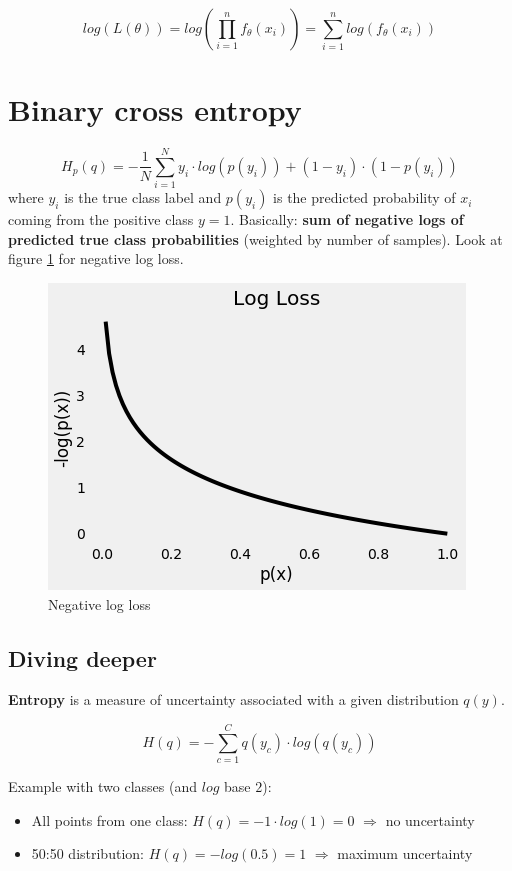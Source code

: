 \documentclass{scrartcl}
\begin{document}
$$log(L(\theta)) = log(\prod_{i=1}^n f_{\theta}(x_i)) = \sum_{i=1}^n log(f_{\theta}(x_i))$$

\section[Binary cross entropy]{Binary cross entropy \cite{bce-tds}}
$$H_p(q) = -\frac{1}{N} \sum_{i=1}^N y_i \cdot log(p(y_i)) + (1-y_i) \cdot (1-p(y_i))$$
where $y_i$ is the true class label and $p(y_i)$ is the predicted probability of $x_i$ coming from the positive class $y=1$. Basically: \textbf{sum of negative logs of predicted true class probabilities} (weighted by number of samples). Look at figure \ref{fig:binary_cross_neg_log} for negative log loss.

\begin{figure}
	\centering
		\includegraphics[scale=0.7]{img/binary_cross_neg_log}
	\caption{Negative log loss}
	\label{fig:binary_cross_neg_log}
\end{figure}

\subsection{Diving deeper}
\textbf{Entropy} is a measure of uncertainty associated with a given distribution $q(y)$.

$$H(q) = - \sum_{c=1}^C q(y_c) \cdot log(q(y_c))$$

Example with two classes (and $log$ base $2$):
\begin{itemize}
	\item
		All points from one class: $H(q) = - 1 \cdot log(1) = 0$ $\Rightarrow$ no uncertainty
	\item
		50:50 distribution: $H(q) = -log(0.5) = 1$ $\Rightarrow$ maximum uncertainty
\end{itemize}
\end{document}
